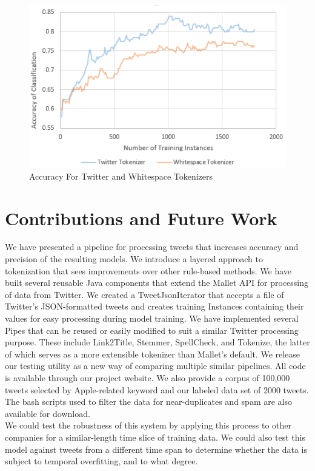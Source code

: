 \documentclass[letterpaper]{article}
\begin{document}
\begin{figure}[ht]
\centering
\includegraphics[width=\linewidth]{chart_twitterVSwhitespace_detailed}
\caption{Accuracy For Twitter and Whitespace Tokenizers}
\label{fig:chart_twitterwhitespace_detailed}
\end{figure}


\section{Contributions and Future Work}
We have presented a pipeline for processing tweets that increases accuracy and precision of the resulting models. We introduce a layered approach to tokenization that sees improvements over other rule-based methods. We have built several reusable Java components that extend the Mallet API for processing of data from Twitter. We created a TweetJsonIterator that accepts a file of Twitter's JSON-formatted tweets and creates training Instances containing their values for easy processing during model training. We have implemented several Pipes that can be reused or easily modified to suit a similar Twitter processing purpose. These include Link2Title, Stemmer, SpellCheck, and Tokenize, the latter of which serves as a more extensible tokenizer than Mallet's default. We release our testing utility as a new way of comparing multiple similar pipelines. All code is available through our project website. We also provide a corpus of 100,000 tweets selected by Apple-related keyword and our labeled data set of 2000 tweets. The bash scripts used to filter the data for near-duplicates and spam are also available for download.\\

We could test the robustness of this system by applying this process to other companies for a similar-length time slice of training data. We could also test this model against tweets from a different time span to determine whether the data is subject to temporal overfitting, and to what degree.\\
\end{document}

